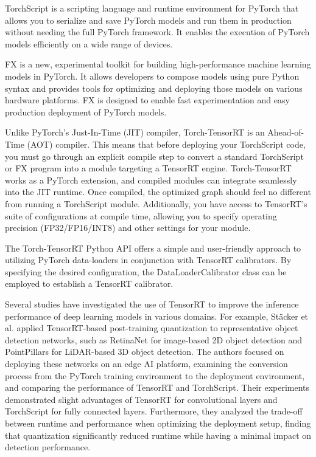 TorchScript is a scripting language and runtime environment for PyTorch that allows you to serialize and save PyTorch models and run them in production without needing the full PyTorch framework. It enables the execution of PyTorch models efficiently on a wide range of devices.

FX is a new, experimental toolkit for building high-performance machine learning models in PyTorch. It allows developers to compose models using pure Python syntax and provides tools for optimizing and deploying those models on various hardware platforms. FX is designed to enable fast experimentation and easy production deployment of PyTorch models.

Unlike PyTorch's Just-In-Time (JIT) compiler, Torch-TensorRT is an Ahead-of-Time (AOT) compiler. This means that before deploying your TorchScript code, you must go through an explicit compile step to convert a standard TorchScript or FX program into a module targeting a TensorRT engine. Torch-TensorRT works as a PyTorch extension, and compiled modules can integrate seamlessly into the JIT runtime. Once compiled, the optimized graph should feel no different from running a TorchScript module. Additionally, you have access to TensorRT's suite of configurations at compile time, allowing you to specify operating precision (FP32/FP16/INT8) and other settings for your module.

The Torch-TensorRT Python API offers a simple and user-friendly approach to utilizing PyTorch data-loaders in conjunction with TensorRT calibrators. By specifying the desired configuration, the DataLoaderCalibrator class can be employed to establish a TensorRT calibrator.

Several studies have investigated the use of TensorRT to improve the inference performance of deep learning models in various domains. For example, St\"acker et al. \cite{stacker2021deployment} applied TensorRT-based post-training quantization to representative object detection networks, such as RetinaNet for image-based 2D object detection and PointPillars for LiDAR-based 3D object detection. The authors focused on deploying these networks on an edge AI platform, examining the conversion process from the PyTorch training environment to the deployment environment, and comparing the performance of TensorRT and TorchScript. Their experiments demonstrated slight advantages of TensorRT for convolutional layers and TorchScript for fully connected layers. Furthermore, they analyzed the trade-off between runtime and performance when optimizing the deployment setup, finding that quantization significantly reduced runtime while having a minimal impact on detection performance.

